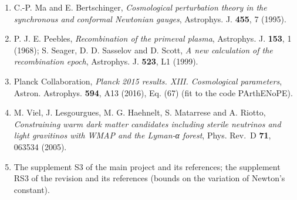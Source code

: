 \documentclass[
  10pt,
]{article}
\providecommand{\tightlist}{%
  \setlength{\itemsep}{0pt}\setlength{\parskip}{0pt}}
\begin{document}
\begin{enumerate}
\def\labelenumi{\arabic{enumi}.}
\tightlist
\item
  C.-P. Ma and E. Bertschinger, \emph{Cosmological perturbation theory
  in the synchronous and conformal Newtonian gauges}, Astrophys. J.
  \textbf{455}, 7 (1995).
\item
  P. J. E. Peebles, \emph{Recombination of the primeval plasma},
  Astrophys. J. \textbf{153}, 1 (1968); S. Seager, D. D. Sasselov and D.
  Scott, \emph{A new calculation of the recombination epoch}, Astrophys.
  J. \textbf{523}, L1 (1999).
\item
  Planck Collaboration, \emph{Planck 2015 results. XIII. Cosmological
  parameters}, Astron. Astrophys. \textbf{594}, A13 (2016), Eq. (67)
  (fit to the code PArthENoPE).
\item
  M. Viel, J. Lesgourgues, M. G. Haehnelt, S. Matarrese and A. Riotto,
  \emph{Constraining warm dark matter candidates including sterile
  neutrinos and light gravitinos with WMAP and the Lyman-α forest},
  Phys. Rev.~D \textbf{71}, 063534 (2005).
\item
  The supplement S3 of the main project and its references; the
  supplement RS3 of the revision and its references (bounds on the
  variation of Newton's constant).
\end{enumerate}
\end{document}
